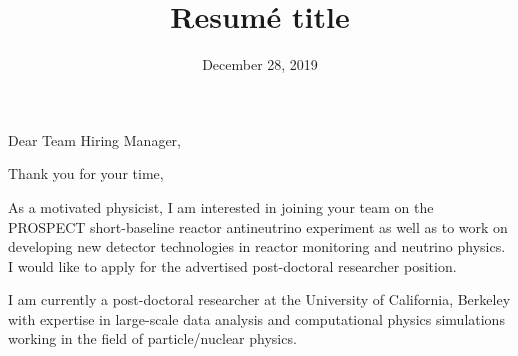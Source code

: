 \documentclass[11pt]{moderncv}        %
\title{Resumé title}                               %
\begin{document}
\date{December 28, 2019}
\opening{Dear Team Hiring Manager,}
\closing{Thank you for your time,}
\makelettertitle

\justifying
As a motivated physicist, I am interested in joining your team on the PROSPECT
short-baseline reactor antineutrino experiment as well as to work on developing
new detector technologies in reactor monitoring and neutrino physics.
I would like to apply for the advertised post-doctoral researcher position.

I am currently a post-doctoral researcher at the University of California,
Berkeley with expertise in large-scale data analysis and computational physics
simulations working in the field of particle/nuclear physics.
\end{document}
